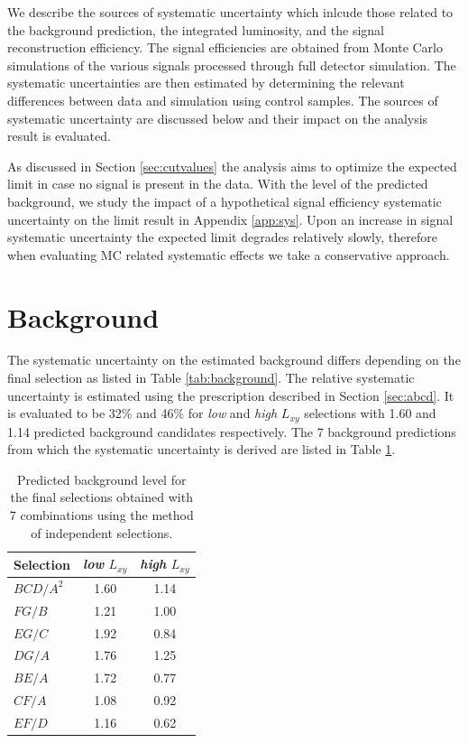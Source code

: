 We describe the sources of systematic uncertainty which inlcude those related to 
the background prediction, the integrated luminosity, and the signal reconstruction efficiency. 
The signal efficiencies are obtained from Monte Carlo simulations of the various signals processed
through full detector simulation. The systematic uncertainties are then estimated by determining
the relevant differences between data and simulation using control samples. The sources
of systematic uncertainty are discussed below and their impact on the analysis result is
evaluated.
 
As discussed in Section \ref{sec:cutvalues} the analysis aims to optimize the expected limit
in case no signal is present in the data.
 With the level of the predicted
background, we study the impact of a hypothetical signal efficiency systematic uncertainty 
on the limit result in Appendix \ref{app:sys}. 
Upon an increase in signal systematic uncertainty the expected limit degrades relatively slowly,
therefore when evaluating MC related systematic effects we take a conservative approach.

\section{Background}
The systematic uncertainty on the estimated background differs depending on the final selection
 as listed in Table \ref{tab:background}. The relative systematic uncertainty is estimated using the prescription
described in Section \ref{sec:abcd}. It is evaluated to be 32\% and 46\%
for {\it low} and {\it high} $L_{xy}$ selections with 1.60 and 1.14 predicted background candidates respectively. 
The 7 background predictions from which the systematic uncertainty is derived are listed in Table \ref{tab:sigbkg}.

\begin{table}[htbp]
\centering
\caption{Predicted background level for the final selections obtained with 7 combinations using the
method of independent selections. \label{tab:sigbkg}}

\begin{tabular}{lcc}

\hline
Selection & {\it low} $L_{xy} $& {\it high} $L_{xy}$ \\
\hline
$BCD/A^2$ & 1.60 & 1.14 \\
$FG/B$ & 1.21 & 1.00 \\
$EG/C$ & 1.92 & 0.84 \\
$DG/A$ & 1.76 & 1.25 \\
$BE/A$ & 1.72 & 0.77 \\
$CF/A$ & 1.08 & 0.92 \\
$EF/D$ & 1.16 & 0.62 \\
\hline

\end{tabular}
\end{table} 


